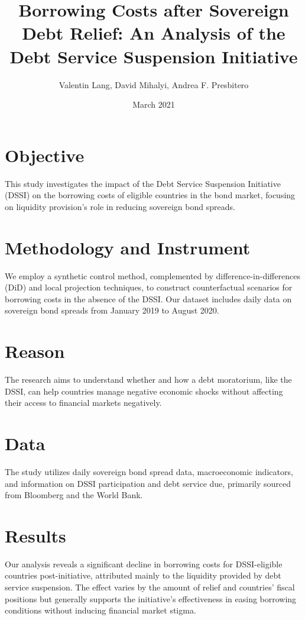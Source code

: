 \documentclass{article}
\begin{document}
\title{Borrowing Costs after Sovereign Debt Relief: An Analysis of the Debt Service Suspension Initiative}
\author{Valentin Lang, David Mihalyi, Andrea F. Presbitero}
\date{March 2021}

\maketitle

\section*{Objective}
This study investigates the impact of the Debt Service Suspension Initiative (DSSI) on the borrowing costs of eligible countries in the bond market, focusing on liquidity provision's role in reducing sovereign bond spreads.

\section*{Methodology and Instrument}
We employ a synthetic control method, complemented by difference-in-differences (DiD) and local projection techniques, to construct counterfactual scenarios for borrowing costs in the absence of the DSSI. Our dataset includes daily data on sovereign bond spreads from January 2019 to August 2020.

\section*{Reason}
The research aims to understand whether and how a debt moratorium, like the DSSI, can help countries manage negative economic shocks without affecting their access to financial markets negatively.

\section*{Data}
The study utilizes daily sovereign bond spread data, macroeconomic indicators, and information on DSSI participation and debt service due, primarily sourced from Bloomberg and the World Bank.

\section*{Results}
Our analysis reveals a significant decline in borrowing costs for DSSI-eligible countries post-initiative, attributed mainly to the liquidity provided by debt service suspension. The effect varies by the amount of relief and countries' fiscal positions but generally supports the initiative's effectiveness in easing borrowing conditions without inducing financial market stigma.
\end{document}
